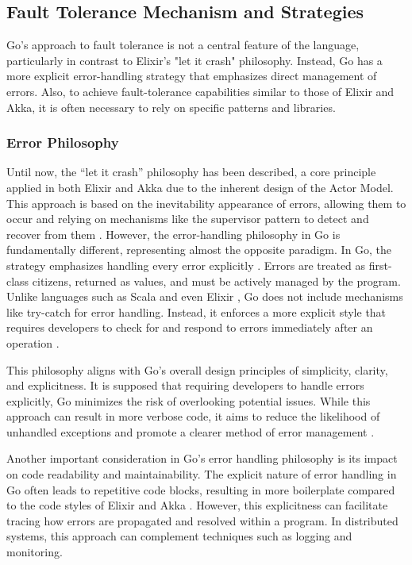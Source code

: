 \subsection{Fault Tolerance Mechanism and Strategies}

Go's approach to fault tolerance is not a central feature of the language, particularly in contrast to Elixir's "let it crash" philosophy. Instead, Go has a more explicit error-handling strategy that emphasizes direct management of errors. Also, to achieve fault-tolerance capabilities similar to those of Elixir and Akka, it is often necessary to rely on specific patterns and libraries.

\subsubsection{Error Philosophy}

Until now, the “let it crash” philosophy has been described, a core principle applied in both Elixir and Akka due to the inherent design of the Actor Model. This approach is based on the inevitability appearance of errors, allowing them to occur and relying on mechanisms like the supervisor pattern to detect and recover from them \cite{Armstrong2013}. However, the error-handling philosophy in Go is fundamentally different, representing almost the opposite paradigm. In Go, the strategy emphasizes handling every error explicitly \cite{Kennedy2016,go-docs}. Errors are treated as first-class citizens, returned as values, and must be actively managed by the program. Unlike languages such as Scala and even Elixir \cite{elixir-docs-hexdocs}, Go does not include mechanisms like try-catch for error handling. Instead, it enforces a more explicit style that requires developers to check for and respond to errors immediately after an operation \cite{Cox-Buday2017}.

This philosophy aligns with Go’s overall design principles of simplicity, clarity, and explicitness. It is supposed that requiring developers to handle errors explicitly, Go minimizes the risk of overlooking potential issues. While this approach can result in more verbose code, it aims to reduce the likelihood of unhandled exceptions and promote a clearer method of error management \cite{Kennedy2016, go-docs}.

Another important consideration in Go’s error handling philosophy is its impact on code readability and maintainability. The explicit nature of error handling in Go often leads to repetitive code blocks, resulting in more boilerplate compared to the code styles of Elixir and Akka \cite{Kennedy2016, go-docs}. However, this explicitness can facilitate tracing how errors are propagated and resolved within a program. In distributed systems, this approach can complement techniques such as logging and monitoring.

